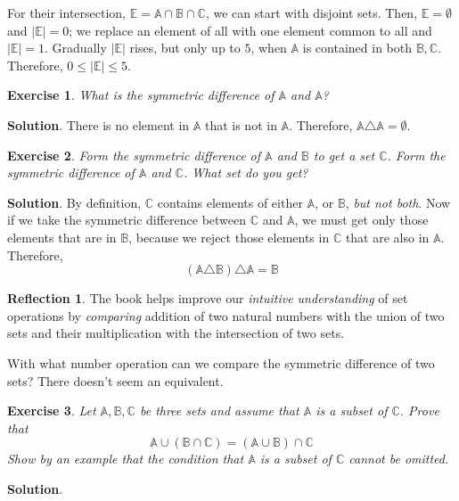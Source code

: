 \documentclass[11pt]{book}
\theoremstyle{definition}
\theoremstyle{plain}
\newtheorem{exercise}{Exercise}
\theoremstyle{definition}
\theoremstyle{problemstyle}
\theoremstyle{remark}
\theoremstyle{definition}
\newtheorem{reflection}{Reflection}
\begin{document}
For their intersection, $\mathbb{E}=\mathbb{A}\cap\mathbb{B}\cap\mathbb{C}$, we can start with disjoint sets. Then, $\mathbb{E}=\emptyset$ and $\lvert\mathbb{E}\rvert=0$; we replace an element of all with one element common to all and $\lvert\mathbb{E}\rvert=1$. Gradually $\lvert\mathbb{E}\rvert$ rises, but only up to $5$, when $\mathbb{A}$ is contained in both $\mathbb{B},\mathbb{C}$. Therefore, $0\leq\lvert\mathbb{E}\rvert\leq5$.
\begin{exercise}
    \label{ex:1.8.15}
    What is the symmetric difference of $\mathbb{A}$ and $\mathbb{A}$?
\end{exercise}
\textbf{Solution}. There is no element in $\mathbb{A}$ that is not in $\mathbb{A}$. Therefore, $\mathbb{A}\triangle\mathbb{A}=\emptyset$.
\begin{exercise}
    \label{ex:1.8.16}
    Form the symmetric difference of $\mathbb{A}$ and $\mathbb{B}$ to get a set $\mathbb{C}$. Form the symmetric difference of $\mathbb{A}$ and $\mathbb{C}$. What set do you get?
\end{exercise}
\textbf{Solution}. By definition, $\mathbb{C}$ contains elements of either $\mathbb{A}$, or $\mathbb{B}$, \emph{but not both}. Now if we take the symmetric difference between $\mathbb{C}$ and $\mathbb{A}$, we must get only those elements that are in $\mathbb{B}$, because we reject those elements in $\mathbb{C}$ that are also in $\mathbb{A}$. Therefore,
\[
    (\mathbb{A}\triangle\mathbb{B})\triangle\mathbb{A}=\mathbb{B}
\]

\begin{reflection}
    The book helps improve our \emph{intuitive understanding} of set operations by \emph{comparing} addition of two natural numbers with the union of two sets and their multiplication with the intersection of two sets.

    With what number operation can we compare the symmetric difference of two sets? There doesn't seem an equivalent.
\end{reflection}
\begin{exercise}
    \label{ex:1.8.17}
    Let $\mathbb{A,B,C}$ be three sets and assume that $\mathbb{A}$ is a subset of $\mathbb{C}$. Prove that
    \begin{equation}
        \label{eq:a+bc=(a+b)c}
        \mathbb{A}\cup(\mathbb{B}\cap\mathbb{C})=(\mathbb{A}\cup\mathbb{B})\cap\mathbb{C}
    \end{equation}
    Show by an example that the condition that $\mathbb{A}$ is a subset of $\mathbb{C}$ cannot be omitted.
\end{exercise}
\textbf{Solution}.
\end{document}
